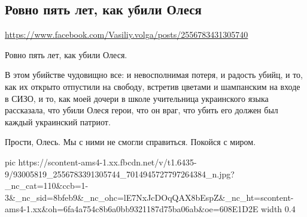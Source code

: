  
 
 
 
 

\subsection{Ровно пять лет, как убили Олеся}
\url{https://www.facebook.com/Vasiliy.volga/posts/2556783431305740}

Ровно пять лет, как убили Олеся. 

В этом убийстве чудовищно все: и невосполнимая потеря, и радость убийц, и то,
как их открыто отпустили на свободу, встретив цветами и шампанским на входе в
СИЗО, и то, как моей дочери в школе учительница украинского языка рассказала,
что убили Олеся герои, что он враг, что убить его должен был каждый украинский
патриот.

Прости, Олесь. Мы с ними не смогли справиться. Покойся с миром.


\ifcmt
  pic https://scontent-ams4-1.xx.fbcdn.net/v/t1.6435-9/93005819_2556783391305744_7014945727797264384_n.jpg?_nc_cat=110&ccb=1-3&_nc_sid=8bfeb9&_nc_ohc=lE7NxJcDOqQAX8bEspZ&_nc_ht=scontent-ams4-1.xx&oh=6fa4a754c8b6a0bb9321187d75ba06ab&oe=608E1D2E
  width 0.4
\fi

